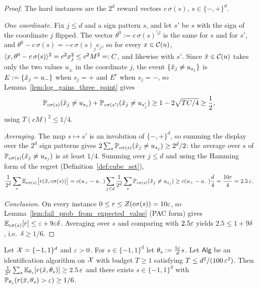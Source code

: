 \begin{proof}
\leanok
{}
The hard instances are the $2^d$ reward vectors $c\,\sigma(s)$, $s \in \{-,+\}^d$.

\emph{One coordinate.} Fix $j \le d$ and a sign pattern $s$, and let $s'$ be $s$ with the sign
of the coordinate $j$ flipped. The vector $\theta^0 := c\,\sigma(s)^{\setminus j}$ is the same
for $s$ and for $s'$, and $\theta^0 - c\,\sigma(s) = -c\,\sigma(s)_je_j$, so for every
$x \in \mathcal{C}(u)$,
$\langle x, \theta^0 - c\,\sigma(s) \rangle^2 = c^2x_j^2 \le c^2M^2 =: C$, and likewise with $s'$. Since
$\hat{x} \in \mathcal{C}(u)$ takes only the two values $u_\pm$ in the coordinate $j$, the event
$\{\hat{x}_j \ne u_{s_j}\}$ is $E := \{\hat{x}_j = u_-\}$ when $s_j = +$ and $E^c$ when $s_j = -$, so
Lemma~\ref{lem:log_gains_three_point} gives
\[
  \mathbb{P}_{c\sigma(s)}(\hat{x}_j \ne u_{s_j}) + \mathbb{P}_{c\sigma(s')}(\hat{x}_j \ne u_{s'_j})
  \ge 1 - 2\sqrt{TC/4} \ge \frac12 ,
\]
using $T(cM)^2 \le 1/4$.

\emph{Averaging.} The map $s \mapsto s'$ is an involution of $\{-,+\}^d$, so summing the
display over the $2^d$ sign patterns gives
$2\sum_s\mathbb{P}_{c\sigma(s)}(\hat{x}_j\ne u_{s_j}) \ge 2^{d}/2$: the average over $s$ of
$\mathbb{P}_{c\sigma(s)}(\hat{x}_j\ne u_{s_j})$ is at least $1/4$. Summing over $j \le d$ and using the
Hamming form of the regret (Definition~\ref{def:cube_set}),
\[
  \frac{1}{2^d}\sum_s\mathbb{E}_{c\sigma(s)}\big[r(\hat{x}, c\sigma(s))\big]
  = c(u_+-u_-)\sum_{j\le d}\frac{1}{2^d}\sum_s\mathbb{P}_{c\sigma(s)}(\hat{x}_j\ne u_{s_j})
  \ge c(u_+-u_-)\frac d4 = \frac{10\varepsilon}{4} = 2.5\,\varepsilon .
\]

\emph{Conclusion.} On every instance $0 \le r \le Z(c\sigma(s)) = 10\varepsilon$, so
Lemma~\ref{lem:fail_prob_from_expected_value} (PAC form) gives
$\mathbb{E}_{c\sigma(s)}[r] \le \varepsilon + 9\varepsilon\delta$. Averaging over $s$ and comparing with $2.5\varepsilon$
yields $2.5 \le 1 + 9\delta$, i.e.\ $\delta \ge 1/6$.
\end{proof}

\begin{theorem}\label{thm:lower_hypercube_pm}
Let $\mathcal{X} = \{-1,1\}^d$ and $\varepsilon > 0$. For $s \in \{-1,1\}^d$ let $\theta_s := \frac{5\varepsilon}{d}s$.
Let $\mathsf{Alg}$ be an identification algorithm on $\mathcal{X}$ with budget $T \ge 1$ satisfying
$T \le d^2/(100\,\varepsilon^2)$. Then
$\frac{1}{2^d}\sum_{s}\mathbb{E}_{\theta_s}[r(\hat{x},\theta_s)] \ge 2.5\,\varepsilon$ and there exists
$s \in \{-1,1\}^d$ with $\mathbb{P}_{\theta_s}(r(\hat{x},\theta_s) > \varepsilon) \ge 1/6$.
\end{theorem}

